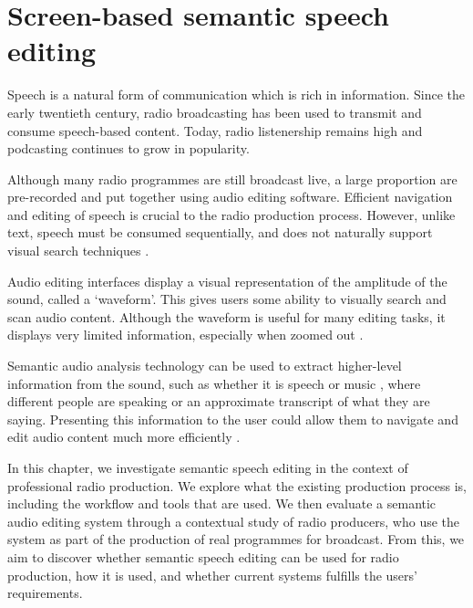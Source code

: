\chapter{Screen-based semantic speech editing}\label{chp:screen}

Speech is a natural form of communication which is rich in information. Since the early twentieth century, radio
broadcasting has been used to transmit and consume speech-based content. Today, radio listenership remains high and
podcasting continues to grow in popularity. 

Although many radio programmes are still broadcast live, a large proportion are pre-recorded and put together using
audio editing software. Efficient navigation and editing of speech is crucial to the radio production process.
However, unlike text, speech must be consumed sequentially, and does not naturally support visual search techniques
\citep{Wolfe2004}. 

Audio editing interfaces display a visual representation of the amplitude of the sound, called a `waveform'. This gives
users some ability to visually search and scan audio content. Although the waveform is useful for many editing tasks,
it displays very limited information, especially when zoomed out \citep{Loviscach2011}.

Semantic audio analysis technology can be used to extract higher-level information from the sound, such as whether it
is speech or music \citep{Panagiotakis2005}, where different people are speaking \citep{AngueraMiro2012} or an
approximate transcript of what they are saying.  Presenting this information to the user could allow them to navigate
and edit audio content much more efficiently \citep{Whittaker2004}.

In this chapter, we investigate semantic speech editing in the context of professional radio production. We explore
what the existing production process is, including the workflow and tools that are used.  We then evaluate a semantic
audio editing system through a contextual study of radio producers, who use the system as part of the production of
real programmes for broadcast. From this, we aim to discover whether semantic speech editing can be used for radio
production, how it is used, and whether current systems fulfills the users' requirements.



